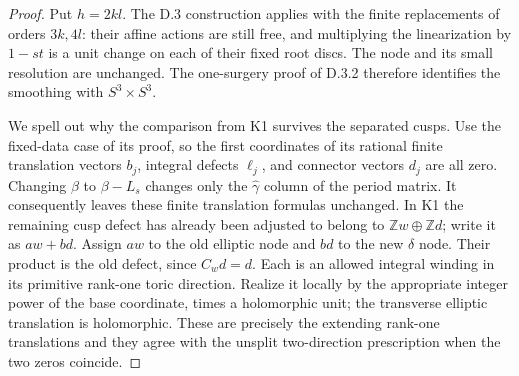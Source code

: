 \begin{proof}
Put $h=2kl$. The D.3 construction applies with the finite
replacements of orders $3k,4l$: their affine actions are still
free, and multiplying the linearization by $1-st$ is a unit
change on each of their fixed root discs. The node and its
small resolution are unchanged. The one-surgery proof of D.3.2
therefore identifies the smoothing with $S^3\times S^3$.

We spell out why the comparison from K1 survives the separated
cusps. Use the fixed-data case of its proof, so the first
coordinates of its rational finite translation vectors $b_j$,
integral defects $\ell_j$, and connector vectors $d_j$ are all
zero. Changing $\beta$ to $\beta-L_s$ changes only the
$\widehat\gamma$ column of the period matrix. It consequently
leaves these finite translation formulas unchanged. In K1 the
remaining cusp defect has already been adjusted to belong to
$\mathbb Z w\oplus\mathbb Z d$; write it as $aw+bd$.
Assign $aw$ to the old elliptic node and $bd$ to the new
$\delta$ node. Their product is the old defect, since
$C_wd=d$. Each is an allowed integral winding in its primitive
rank-one toric direction. Realize it locally by the appropriate
integer power of the base coordinate, times a holomorphic unit;
the transverse elliptic translation is holomorphic. These
are precisely the extending rank-one translations and they
agree with the unsplit two-direction prescription when the
two zeros coincide.


\end{proof}

